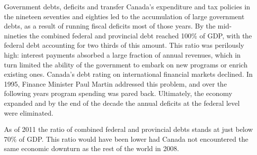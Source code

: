 \begin{ApplicationBox}{Government debts, deficits and transfer \label{app:govdebtdeftran}}
Canada's expenditure and tax policies in the nineteen seventies and eighties led to the accumulation of large government debts, as a result of running fiscal deficits most of those years. By the mid-nineties the combined federal and provincial debt reached 100\% of GDP, with the federal debt accounting for two thirds of this amount. This ratio was perilously high: interest payments absorbed a large fraction of annual revenues, which in turn limited the ability of the government to embark on new programs or enrich existing ones. Canada's debt rating on international financial markets declined.  
In 1995, Finance Minister Paul Martin addressed this problem, and over the following years program spending was pared back. Ultimately, the economy expanded and by the end of the decade the annual deficits at the federal level were eliminated.

\bigskip
As of 2011 the ratio of combined federal and provincial debts stands at just below 70\% of GDP. This ratio would have been lower had Canada not encountered the same economic downturn as the rest of the world in 2008.
\end{ApplicationBox}